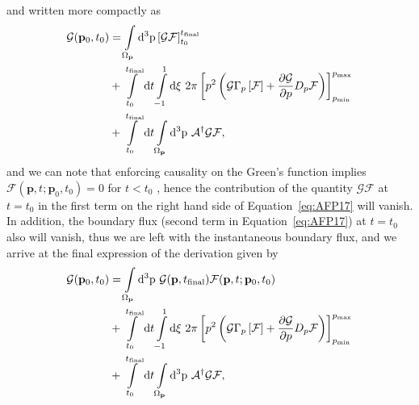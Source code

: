 \documentclass[preprint,aip]{revtex4-2}
\newcommand{\JA}[1]{{\color{blue}{[JA: #1]}}}
\begin{document}
and written more compactly as
\begin{equation}\label{eq:AFP17}
\begin{aligned}
\mathcal{G}(\mathbf{p}_0,t_0)
 &= \int\displaylimits_{\Omega_\mathbf{p}}\mathrm{d^3p}
	 \left[\mathcal{GF}\right]_{t_0}^{t_\mathrm{final}} \\
	&+ \int\displaylimits_{t_0}^{t_\mathrm{final}}\mathrm{d}t
\int\displaylimits_{-1}^{1}\mathrm{d}\xi \ 2\pi
	\left[p^2\left(\mathcal{G}\Gamma_p\left[\mathcal{F}\right] + \frac{\partial\mathcal{G}}{\partial p}D_p\mathcal{F}\right)\right]_{p_\mathrm{min}}^{p_\mathrm{max}} \\
	&+ \int\displaylimits_{t_0}^{t_\mathrm{final}}\mathrm{d}t
\int\displaylimits_{\Omega_\mathbf{p}}\mathrm{d^3p} \ \mathcal{A}^\dagger\mathcal{GF},
\end{aligned}
\end{equation}
and we can note that enforcing causality on the Green's function implies $\mathcal{F}(\mathbf{p},t;\mathbf{p}_0,t_0) = 0$ for $t<t_0$ \JA{Double check this}, hence the contribution of the quantity $\mathcal{GF}$ at $t=t_0$ in the first term on the right hand side of Equation~\ref{eq:AFP17} will vanish. In addition, the boundary flux (second term in Equation~\ref{eq:AFP17}) at $t=t_0$ also will vanish, thus we are left with the instantaneous boundary flux, and we arrive at the final expression of the derivation given by
\begin{equation}\label{eq:AFP18}
\begin{aligned}
\mathcal{G}(\mathbf{p}_0,t_0)
 &= \int\displaylimits_{\Omega_\mathbf{p}}\mathrm{d^3p}
	 \ \mathcal{G}(\mathbf{p},t_\mathrm{final})\mathcal{F}(\mathbf{p},t;\mathbf{p}_0,t_0) \\
	&+ \int\displaylimits_{t_0}^{t_\mathrm{final}}\mathrm{d}t
\int\displaylimits_{-1}^{1}\mathrm{d}\xi \ 2\pi
	\left[p^2\left(\mathcal{G}\Gamma_p\left[\mathcal{F}\right] + \frac{\partial\mathcal{G}}{\partial p}D_p\mathcal{F}\right)\right]_{p_\mathrm{min}}^{p_\mathrm{max}} \\
	&+ \int\displaylimits_{t_0}^{t_\mathrm{final}}\mathrm{d}t
\int\displaylimits_{\Omega_\mathbf{p}}\mathrm{d^3p} \ \mathcal{A}^\dagger\mathcal{GF},
\end{aligned}
\end{equation}
\end{document}
